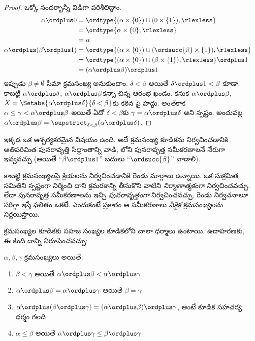 \documentclass[../../../include/open-logic-section]{subfiles}
\begin{document}
\begin{proof}
ఒక్కో సందర్భాన్నీ విడిగా పరిశీలిద్దాం.
\begin{align*}
	\alpha \ordplus  0
	& = \ordtype{(\alpha \times \{0\}) \cup (0 \times \{1\}), \rlexless} \\
	&= \ordtype{\alpha \times \{0\}, \rlexless}\\
	&= \alpha\\
	\alpha \ordplus (\beta \ordplus  1)
	&= \ordtype{(\alpha\times \{0\}) \cup (\ordsucc{\beta}\times \{1\}), \rlexless} \\
	&= \ordtype{(\alpha\times \{0\}) \cup (\beta \times \{1\}), \rlexless} \ordplus 1\\
	&= (\alpha \ordplus  \beta) \ordplus  1
\end{align*}
ఇప్పుడు $\beta \neq \emptyset$ సీమా క్రమసంఖ్య అనుకుందాం. $\delta < \beta$ అయితే $\delta\ordplus 1 < \beta$ కూడా. కాబట్టి $\alpha \ordplus  \delta$, $\alpha \ordplus  \beta$కన్నా చిన్న ఆరంభ ఖండం. కనుక $\alpha
\ordplus  \beta$, $X = \Setabs{\alpha
\ordplus  \delta}{\delta < \beta}$కు కఠిన పై హద్దు. అంతేకాక $\alpha \leq \gamma <
\alpha \ordplus  \beta$ అయితే ఏదో $\delta < \beta$కు $\gamma = \alpha \ordplus
\delta$ అని స్పష్టం. అందువల్ల $\alpha \ordplus  \beta =
\supstrict_{\delta< \beta}(\alpha\ordplus \delta)$.
\end{proof}

ఇక్కడ ఒక ఆశ్చర్యకరమైన విషయం ఉంది. అదే క్రమసంఖ్య కూడికను నిర్వచించడానికి అతిపరిమిత పునరావృత్తి సిద్ధాంతాన్ని వాడి, లోని పునరావృత్త సమీకరణాలనే నేరుగా ఇవ్వవచ్చు (అయితే ``$\beta \ordplus 1$'' బదులు ``$\ordsucc{\beta}$'' వాడాలి).

కాబట్టి క్రమసంఖ్యలపై క్రియలను నిర్వచించడానికి రెండు మార్గాలు ఉన్నాయి. ఒక సుక్రమిత సమితిని స్పష్టంగా నిర్మించి దాని క్రమరకాన్ని తీసుకొని వాటిని \emph{నిర్మాణాత్మకంగా} నిర్వచించవచ్చు. లేదా పునరావృత్త సమీకరణాలను ఇచ్చి \emph{పునరావృత్తంగా} నిర్వచించవచ్చు. రెండు నిర్వచనాలూ సరిగ్గా ఇస్తే ఫలితం ఒకటే. ఎందుకంటే  ప్రకారం ఆ సమీకరణాలు \emph{ఏకైక} క్రమసంఖ్యలను నిర్ణయిస్తాయి.

క్రమసంఖ్యల కూడికకు సహజ సంఖ్యల కూడికలోని చాలా ధర్మాలు ఉంటాయి. ఉదాహరణకు, ఈ కింది దాన్ని నిరూపించవచ్చు:

\begin{lem}
$\alpha, \beta, \gamma$ క్రమసంఖ్యలు అయితే:
\begin{enumerate}
	\item{} $\beta < \gamma$ అయితే $\alpha
	\ordplus  \beta < \alpha \ordplus  \gamma$
	\item{} $\alpha \ordplus  \beta =
	\alpha\ordplus \gamma$ అయితే $\beta = \gamma$
	\item{} $\alpha \ordplus  (\beta \ordplus
	\gamma) = (\alpha \ordplus  \beta) \ordplus  \gamma$, అంటే కూడిక సహచర్య ధర్మం గలది
	\item{} $\alpha \leq \beta$ అయితే $\alpha
	\ordplus  \gamma \leq \beta \ordplus \gamma$
\end{enumerate}
\end{lem}
\end{document}
